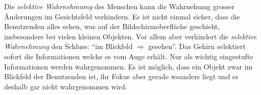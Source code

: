 
Die \textit{selektive Wahrnehmumg} des Menschen kann die Wahrnehumg grosser Änderungen im Gesichtsfeld verhindern.
Es ist nicht einmal sicher, dass die Benutzenden alles sehen, was auf der Bildschirmoberfläche geschieht, 
insbesondere bei vielen kleinen Objekten.
Vor allem aber verhindert die \textit{selektive Wahrnehmung} den Schluss: 
\enquote{im Blickfeld $\Rightarrow$ gesehen}. 
Das Gehirn selektiert sofort die Informationen welche es vom Auge erhält. 
Nur als wichtig eingestufte Informationen werden wahrgenommen. 
Es ist möglich, dass ein Objekt zwar im Blickfeld der Benutzenden ist, 
ihr Fokus aber gerade woanders liegt und es deshalb gar nicht wahrgenommen wird.